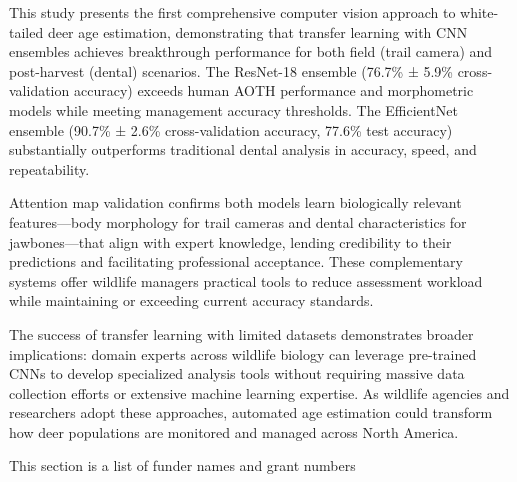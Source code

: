 \documentclass{iopjournal}
\begin{document}
This study presents the first comprehensive computer vision approach to white-tailed deer age estimation, demonstrating that transfer learning with CNN ensembles achieves breakthrough performance for both field (trail camera) and post-harvest (dental) scenarios. The ResNet-18 ensemble (76.7\% ± 5.9\% cross-validation accuracy) exceeds human AOTH performance and morphometric models while meeting management accuracy thresholds. The EfficientNet ensemble (90.7\% ± 2.6\% cross-validation accuracy, 77.6\% test accuracy) substantially outperforms traditional dental analysis in accuracy, speed, and repeatability.

Attention map validation confirms both models learn biologically relevant features—body morphology for trail cameras and dental characteristics for jawbones—that align with expert knowledge, lending credibility to their predictions and facilitating professional acceptance. These complementary systems offer wildlife managers practical tools to reduce assessment workload while maintaining or exceeding current accuracy standards.

The success of transfer learning with limited datasets demonstrates broader implications: domain experts across wildlife biology can leverage pre-trained CNNs to develop specialized analysis tools without requiring massive data collection efforts or extensive machine learning expertise. As wildlife agencies and researchers adopt these approaches, automated age estimation could transform how deer populations are monitored and managed across North America.





 This section is a list of funder names and grant numbers
\end{document}
